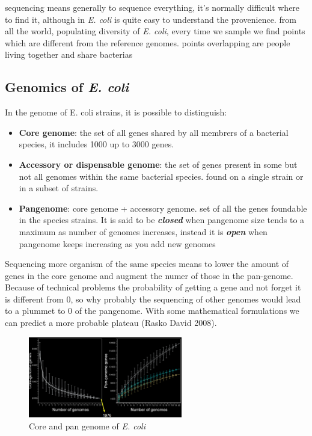 sequencing means generally to sequence everything, it's normally difficult where to find it, although in \emph{\emph{E. coli}} is quite easy to understand the provenience.
from all the world, populating diversity of \emph{\emph{E. coli}}, every time we sample we find points which are different from the reference genomes.
points overlapping are people living together and share bacterias


\subsection{Genomics of \emph{E. coli}}

In the genome of E. coli strains, it is possible to distinguish:

\begin{itemize}
    \item \textbf{Core genome}: the set of all genes shared by all membrers of a bacterial species, it includes 1000 up to 3000 genes.
    \item \textbf{Accessory or dispensable genome}: the set of genes present in some but not all genomes within the same bacterial species. found on a single strain or in a subset of strains. 
    \item \textbf{Pangenome}: core genome + accessory genome. set of all the genes foundable in the species strains. It is said to be \textit{\textbf{closed}} when pangenome size tends to a maximum as number of genomes increases, instead it is \textit{\textbf{open}} when pangenome keeps increasing as you add new genomes
\end{itemize}


Sequencing more organism of the same species means to lower the amount of genes in the core genome and augment the numer of those in the pan-genome. 
Because of technical problems the probability of getting a gene and not forget it is different from 0, so why probably the sequencing of other genomes would lead to a plummet to 0 of the pangenome. With some mathematical formulations we can predict a more probable plateau (Rasko David 2008). 

\begin{figure}[h]
\caption{Core and pan genome of \emph{E. coli}}
\centering
\includegraphics[width=0.6\textwidth]{EcoliCorePanGenome}
\end{figure}

